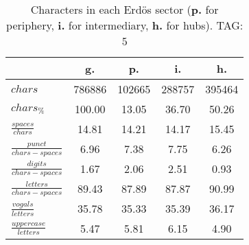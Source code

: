 \begin{table}[h!]
\begin{center}
\begin{tabular}{| l | c | c | c | c |}\hline
 & g. & p. & i. & h. \\\hline
$chars$ & 786886  & 102665  & 288757  & 395464 \\\hline
$chars_{\%}$ & 100.00  & 13.05  & 36.70  & 50.26 \\\hline
$\frac{spaces}{chars}$ & 14.81  & 14.21  & 14.17  & 15.45 \\\hline
$\frac{punct}{chars-spaces}$ & 6.96  & 7.38  & 7.75  & 6.26 \\\hline
$\frac{digits}{chars-spaces}$ & 1.67  & 2.06  & 2.51  & 0.93 \\\hline
$\frac{letters}{chars-spaces}$ & 89.43  & 87.89  & 87.87  & 90.99 \\\hline
$\frac{vogals}{letters}$ & 35.78  & 35.33  & 35.39  & 36.17 \\\hline
$\frac{uppercase}{letters}$ & 5.47  & 5.81  & 6.15  & 4.90 \\\hline
\end{tabular}
\caption{Characters in each Erd\"os sector ({{\bf p.}} for periphery, {{\bf i.}} for intermediary, 
    {{\bf h.}} for hubs). TAG: 5}
\end{center}
\end{table}